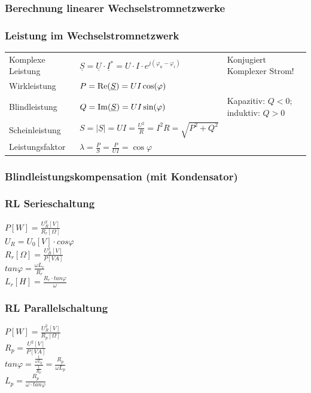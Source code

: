 		\subsubsection{Berechnung linearer Wechselstromnetzwerke}
		\subsubsection{Leistung im Wechselstromnetzwerk}%
				\begin{tabular}{p{4.5cm}p{7cm}p{7cm}}
					Komplexe Leistung &
						$ \underline{S} = \underline{U} \cdot \underline{I}^\ast = U\cdot I \cdot e^{j(\varphi_u-\varphi_i)}$   &
						Konjugiert Komplexer Strom! \\
					Wirkleistung &
						$ P = \operatorname{Re}(\underline{S}) = U I \cos(\varphi) $ \\
					Blindleistung &
						$ Q = \operatorname{Im}(\underline{S}) = U I \sin(\varphi) $ &
						Kapazitiv: $Q < 0$; induktiv: $Q > 0$ \\
					Scheinleistung &
						$ S = | \underline{S} | = U I = \frac{U^2}{R} = I^2 R = \sqrt{P^2+Q^2}$ \\
					Leistungsfaktor &
						$\lambda = \frac{P}{S} = \frac{P}{UI} = \cos \varphi$ \\
				\end{tabular}
		\subsubsection{Blindleistungskompensation (mit Kondensator)}
		
		\begin{multicols}{2}
			\subsubsection{RL Serieschaltung}
				$P\left[W\right]=\frac{U^2_R\left[V\right]}{R_r\left[\Omega\right]}$\\
				$U_R=U_0\left[V\right]\cdot cos\varphi$\\
				$R_r\left[\Omega\right]=\frac{U^2_R\left[V\right]}{P\left[VA\right]}$\\
				$tan\varphi =\frac{\omega L_r}{R_r}$\\
				$L_r\left[H\right]=\frac{R_r \cdot tan \varphi}{\omega}$
				\columnbreak
				
			\subsubsection{RL Parallelschaltung}
				$P\left[W\right]=\frac{U^2_R\left[V\right]}{R_p\left[\Omega\right]}$\\
				$R_p=\frac{U^2\left[V\right]}{P\left[VA\right]}$\\
				$tan\varphi = \frac{\frac{1}{\omega L_p}}{\frac{1}{R_p}}=\frac{R_p}{\omega
				L_p}$\\
				$L_p= \frac{R_p}{\omega \cdot tan\varphi}$
				
		\end{multicols}
		
